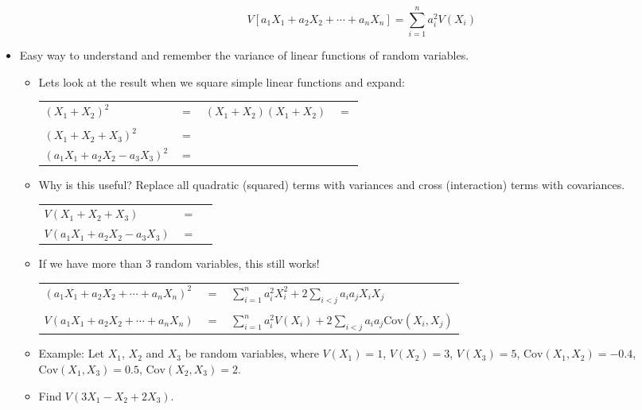 \documentclass{article}
\newcommand{\cov}[1]{\mathrm{Cov}(#1)}		%
\begin{document}
\begin{itemize}
\begin{enumerate}[(i)]
        \[V[a_1 X_1 + a_2 X_2+ \cdots + a_n X_n] = \sum_{i = 1}^n a_i^2 V(X_i)\]
    \end{enumerate}
    \item Easy way to understand and remember the variance of linear functions of random variables.
    \begin{itemize}
        \item Lets look at the result when we square simple linear functions and expand:\vspace{20pt}\\
        \begin{tabular}{l l l l}
            $(X_1 + X_2)^2$ & $=$ & $(X_1 + X_2) (X_1 + X_2)$ & $=$ \\\\
            $(X_1 + X_2 + X_3)^2$ & $=$ & & \vspace{60pt}\\
            $(a_1 X_1 + a_2 X_2 - a_3 X_3)^2$ & $=$ & & \\
        \end{tabular}\vspace{40pt}
        \item Why is this useful? Replace all quadratic (squared) terms with variances and cross (interaction) terms with covariances.\bigskip\\
        \begin{tabular}{l l l}
            $V(X_1 + X_2 + X_3)$ & $=$ \vspace{40pt}\\
            $V(a_1 X_1 + a_2 X_2 - a_3 X_3)$ & $=$ \\
        \end{tabular}\bigskip\newpage
        \item If we have more than 3 random variables, this still works!\bigskip\\
        \begin{tabular}{l l l}
            $(a_1 X_1 + a_2 X_2 + \cdots + a_n X_n)^2$ & $=$ & $\displaystyle \sum_{i = 1}^n a_i^2 X_i^2 + 2 \sum_{i < j} a_i a_j X_i X_j$ \\\\
            $V(a_1 X_1 + a_2 X_2 + \cdots + a_n X_n)$ & $=$ & $\displaystyle \sum_{i = 1}^n a_i^2 V(X_i) + 2 \sum_{i < j} a_i a_j \cov{X_i, X_j}$ \\
        \end{tabular}\bigskip
        \item Example: Let $X_1$, $X_2$ and $X_3$ be random variables, where 
$V(X_1) = 1$, $V(X_2) = 3$, $V(X_3) = 5$, $\cov{X_1,X_2} =-0.4$, $\cov{X_1,X_3} = 0.5$, $\cov{X_2,X_3} = 2$.
    \item[] Find $V(3 X_1 - X_2 + 2 X_3)$.\vspace{150pt}
    \end{itemize}
\end{itemize}\bigskip
\end{document}
